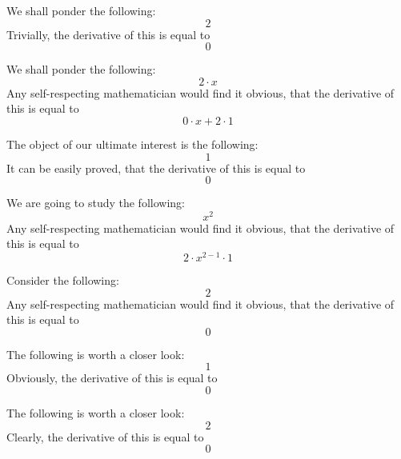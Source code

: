 \documentclass{article}
\begin{document}
We shall ponder the following:
\begin{equation}
2 
\end{equation}
Trivially, the derivative of this is equal to
\begin{equation}
0 
\end{equation}

We shall ponder the following:
\begin{equation}
2 \cdot x 
\end{equation}
Any self-respecting mathematician would find it obvious, that the derivative of this is equal to
\begin{equation}
0 \cdot x + 2 \cdot 1 
\end{equation}

The object of our ultimate interest is the following:
\begin{equation}
1 
\end{equation}
It can be easily proved, that the derivative of this is equal to
\begin{equation}
0 
\end{equation}

We are going to study the following:
\begin{equation}
x ^{2 } 
\end{equation}
Any self-respecting mathematician would find it obvious, that the derivative of this is equal to
\begin{equation}
2 \cdot x ^{2 - 1 } \cdot 1 
\end{equation}

Consider the following:
\begin{equation}
2 
\end{equation}
Any self-respecting mathematician would find it obvious, that the derivative of this is equal to
\begin{equation}
0 
\end{equation}

The following is worth a closer look:
\begin{equation}
1 
\end{equation}
Obviously, the derivative of this is equal to
\begin{equation}
0 
\end{equation}

The following is worth a closer look:
\begin{equation}
2 
\end{equation}
Clearly, the derivative of this is equal to
\begin{equation}
0 
\end{equation}
\end{document}

